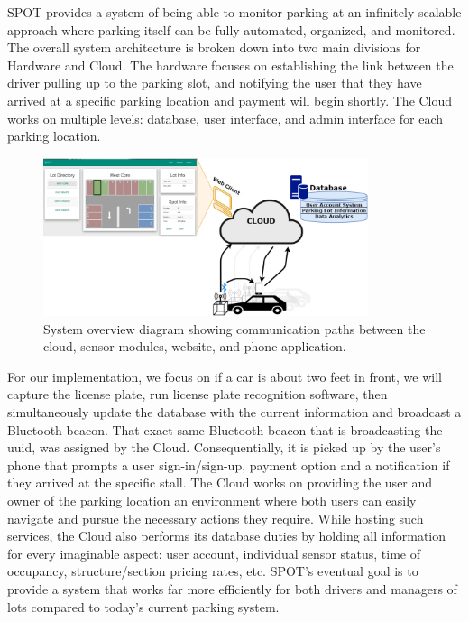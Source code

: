 SPOT provides a system of being able to monitor parking at an infinitely scalable approach where parking itself can be fully automated, organized, and monitored. 
The overall system architecture is  broken down into two main divisions for Hardware and Cloud. 
The hardware focuses on establishing the link between the driver pulling up to the parking slot, and notifying the user that they have arrived at a specific parking location and payment will begin shortly. 
The Cloud works on multiple levels: database, user interface, and admin interface for each parking location.

\vspace{0.5cm}
\begin{figure}[ht!]
\centering
\includegraphics[width=0.85\textwidth]{pictures/SystemOverview.png}
\caption{System overview diagram showing communication paths between the cloud, sensor modules, website, and phone application.}
\end{figure}
For our implementation, we focus on if a car is about two feet in front, we will capture the license plate, run license plate recognition software, then simultaneously update the database with the current information and broadcast a Bluetooth beacon.
That exact same Bluetooth beacon that is broadcasting the uuid, was assigned by the Cloud.
Consequentially, it is picked up by the user’s phone that prompts a user sign-in/sign-up, payment option and a notification if they arrived at the specific stall. 
The Cloud works on providing the user and owner of the parking location an environment where both users can easily navigate and pursue the necessary actions they require. 
While hosting such services, the Cloud also performs its database duties by holding all information for every imaginable aspect: user account, individual sensor status, time of occupancy, structure/section pricing rates, etc.  
SPOT’s eventual goal is to provide a system that works far more efficiently for both drivers and managers of lots compared to today’s current parking system. 
